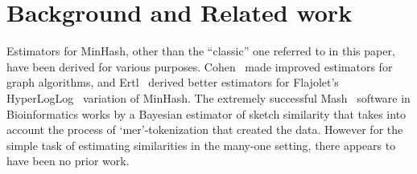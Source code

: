 
\section{Background and Related work}

Estimators for MinHash, other than the ``classic'' one referred to in this paper, have been derived for various purposes.
Cohen~\cite{DBLP:reference/algo/Cohen16b} made improved estimators for graph algorithms,
and Ertl~\cite{DBLP:journals/corr/Ertl17} derived better estimators for Flajolet's HyperLogLog~\cite{flajolet1985probabilistic} variation of MinHash.
%
The extremely successful Mash~\cite{ondov2016mash} software in Bioinformatics works by
a Bayesian estimator of sketch similarity that takes into account the process of `mer'-tokenization that created the data.
However for the simple task of estimating similarities in the many-one setting, there appears to have been no prior work.






